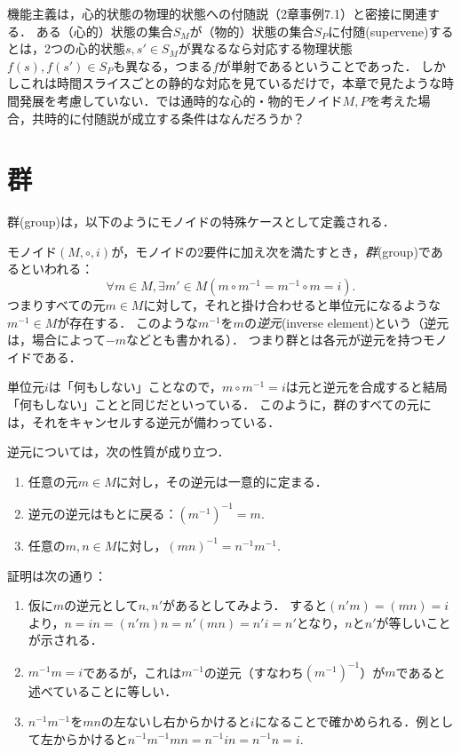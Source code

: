\documentclass[11pt,a4paper]{jsarticle}
\begin{document}
\begin{exercise}
    機能主義は，心的状態の物理的状態への付随説（2章事例7.1）と密接に関連する．
    ある（心的）状態の集合$S_M$が（物的）状態の集合$S_P$に付随(supervene)するとは，2つの心的状態$s, s' \in S_M$が異なるなら対応する物理状態$f(s), f(s') \in S_P$も異なる，つまる$f$が単射であるということであった．
    しかしこれは時間スライスごとの静的な対応を見ているだけで，本章で見たような時間発展を考慮していない．では通時的な心的・物的モノイド$M, P$を考えた場合，共時的に付随説が成立する条件はなんだろうか？
\end{exercise}


\section{群}
群(group)は，以下のようにモノイドの特殊ケースとして定義される．
\begin{dfn}[群]
    モノイド$(M, \circ, i)$が，モノイドの2要件に加え次を満たすとき，\emph{群}(group)であるといわれる：
    \[ \forall m \in M, \exists m' \in M (m \circ m^{-1} = m^{-1} \circ m = i).\]
    つまりすべての元$m \in M$に対して，それと掛け合わせると単位元になるような$m^{-1} \in M$が存在する．
    このような$m^{-1}$を$m$の\emph{逆元}(inverse element)という（逆元は，場合によって$-m$などとも書かれる）．
    つまり群とは各元が逆元を持つモノイドである．
\end{dfn}    

単位元$i$は「何もしない」ことなので，$m \circ m^{-1} = i$は元と逆元を合成すると結局「何もしない」ことと同じだといっている．
このように，群のすべての元には，それをキャンセルする逆元が備わっている．

逆元については，次の性質が成り立つ．
\begin{enumerate}
    \item 任意の元$m \in M$に対し，その逆元は一意的に定まる．
    \item 逆元の逆元はもとに戻る：$(m^{-1})^{-1}=m$.
    \item 任意の$m,n \in M$に対し，$(mn)^{-1}=n^{-1}m^{-1}$.
\end{enumerate}
証明は次の通り：
\begin{enumerate}
    \item 仮に$m$の逆元として$n, n'$があるとしてみよう．
    すると$(n'm)=(mn)=i$より，$n = in = (n'm)n = n'(mn) = n'i = n'$となり，$n$と$n'$が等しいことが示される．
    \item $m^{-1}m=i$であるが，これは$m^{-1}$の逆元（すなわち$(m^{-1})^{-1}$）が$m$であると述べていることに等しい．
    \item $n^{-1}m^{-1}$を$mn$の左ないし右からかけると$i$になることで確かめられる．例として左からかけると$n^{-1}m^{-1}mn = n^{-1} i n = n^{-1}n = i$.
\end{enumerate}
\end{document}
